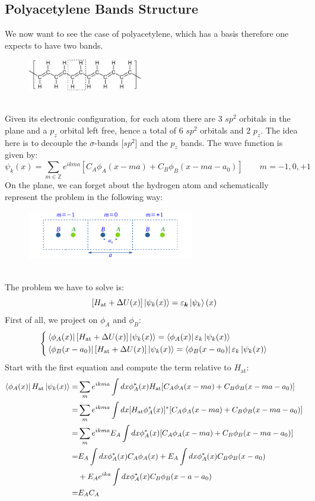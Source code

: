 \documentclass[10.75pt,a4paper,openright,bottom=2cm]{article}
\renewcommand{\Vec}[1]{\boldsymbol{#1}}
\begin{document}
\subsection{Polyacetylene Bands Structure}
We now want to see the case of polyacetylene, which has a basis therefore one expects to have two bands.
\begin{figure}[h]
    \centering
    \includegraphics[width=0.45\textwidth]{polyacetylene.pdf}
    \label{fig:polyacetylene}
\end{figure}\\
\noindent
Given its electronic configuration, for each atom there are 3 $sp^2$ orbitals in the plane and a $p_z$ orbital left free, hence a total of 6 $sp^2$ orbitals and 2 $p_z$. The idea here is to decouple the $\sigma$-bands [$sp^2$] and the $p_z$ bands. The wave function is given by:
\[
\psi_k(x)=\sum_{m\in\mathbb{Z}}e^{ikma}[C_A\phi_A(x-ma)+C_B\phi_B(x-ma-a_0)] \qquad m=-1,0,+1
\]
On the plane, we can forget about the hydrogen atom and schematically represent the problem in the following way:
\begin{figure}[h]
    \centering
    \includegraphics[width=0.65\textwidth]{polyscheme.pdf}
    \label{fig:polyscheme}
\end{figure}\\
\noindent
The problem we have to solve is:
\[
[H_{\text{at}}+\Delta U(x)]\ket{\psi_k(x)}=\varepsilon_{\Vec{k}}\ket{\psi_k}(x)
\]
First of all, we project on $\phi_A$ and $\phi_B$:
\[
\left\{
\begin{aligned}
&\bra{\phi_A(x)}[H_{\text{at}}+\Delta U(x)]\ket{\psi_k(x)}=\bra{\phi_A(x)}\varepsilon_k\ket{\psi_k(x)}\\
&\bra{\phi_B(x-a_0)}[H_{\text{at}}+\Delta U(x)]\ket{\psi_k(x)}=\bra{\phi_B(x-a_0)}\varepsilon_k\ket{\psi_k(x)}
\end{aligned}
\right.
\]
Start with the first equation and compute the term relative to $H_{\text{at}}$:
\begin{align*}
\bra{\phi_A(x)}H_{\text{at}}\ket{\psi_k(x)}=&\sum_me^{ikma}\int dx\phi_A^*(x)H_{\text{at}}[C_A\phi_A(x-ma)+C_B\phi_B(x-ma-a_0)]\\
=&\sum_me^{ikma}\int dx[H_{\text{at}}\phi_A^*(x)]^*[C_A\phi_A(x-ma)+C_B\phi_B(x-ma-a_0)]\\
=&\sum_me^{ikma}E_A\int dx\phi_A^*(x)[C_A\phi_A(x-ma)+C_B\phi_B(x-ma-a_0)]\\
=&E_A\int dx\phi_A^*(x)C_A\phi_A(x)+E_A\int dx\phi_A^*(x)C_B\phi_B(x-a_0)\\
&+E_Ae^{ika}\int dx\phi_A^*(x)C_B\phi_B(x-a-a_0)\\
=&E_AC_A
\end{align*}
\end{document}

